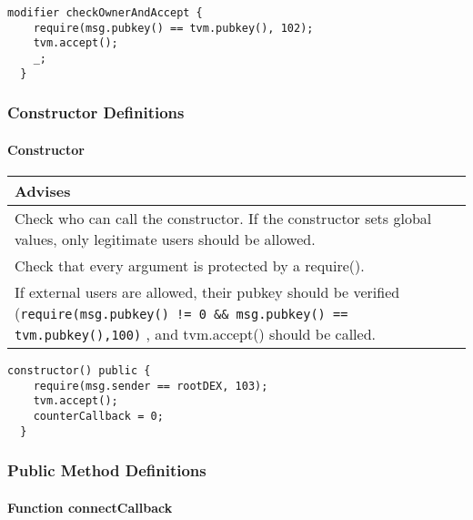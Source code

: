 \begin{lstlisting}[firstnumber=79]
  modifier checkOwnerAndAccept {
    require(msg.pubkey() == tvm.pubkey(), 102);
    tvm.accept();
    _;
  }
\end{lstlisting}

\subsubsection{Constructor Definitions}


\paragraph{Constructor}


\ifsoldraft
\noindent\begin{tabular}{|p{12cm}|}\hline
\rowcolor{green}Advises
\\\hline
Check who can call the constructor. If the constructor sets global values, only legitimate users should be allowed.
\\\hline
Check that every argument is protected by a require().
\\\hline
If external users are allowed, their pubkey should be verified (\verb+require(msg.pubkey() != 0 && msg.pubkey() == tvm.pubkey(),100)+ , and tvm.accept() should be called.
\\\hline\end{tabular}
\fi
\vspace{2cm}

\begin{lstlisting}[firstnumber=85]
  constructor() public {
    require(msg.sender == rootDEX, 103);
    tvm.accept();
    counterCallback = 0;
  }
\end{lstlisting}

\subsubsection{Public Method Definitions}


\paragraph{Function connectCallback}


